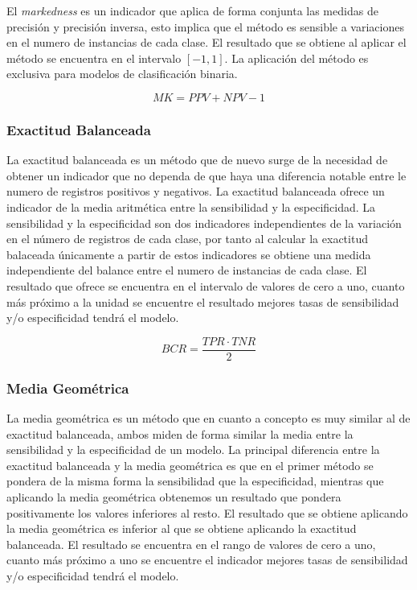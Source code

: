 El \textit{markedness} es un indicador que aplica de forma conjunta las medidas de precisión y precisión inversa, esto implica que el método es sensible a variaciones en el numero de instancias de cada clase. El resultado que se obtiene al aplicar el método se encuentra en el intervalo $[-1, 1]$. La aplicación del método es exclusiva para modelos de clasificación binaria.  


\bigbreak

\begin{equation}
    MK = PPV + NPV - 1
    \label{eq:MK}
\end{equation}


\subsubsection{Exactitud Balanceada}

La exactitud balanceada \cite{bcr2010} es un método que de nuevo surge de la necesidad de obtener un indicador que no dependa de que haya una diferencia notable entre le numero de registros positivos y negativos. La exactitud balanceada ofrece un indicador de la media aritmética entre la sensibilidad y la especificidad. La sensibilidad y la especificidad son dos indicadores independientes de la variación en el número de registros de cada clase, por tanto al calcular la exactitud balaceada únicamente a partir de estos indicadores se obtiene una medida independiente del balance entre el numero de instancias de cada clase. El resultado que ofrece se encuentra en el intervalo de valores de cero a uno, cuanto más próximo a la unidad se encuentre el resultado mejores tasas de sensibilidad y/o especificidad tendrá el modelo.

\bigbreak

\begin{equation}
    BCR = \frac{TPR \cdot TNR}{2}
    \label{eq:BCR}
\end{equation}


\subsubsection{Media Geométrica}

La media geométrica \cite{tharwat_2018} es un método que en cuanto a concepto es muy similar al de exactitud balanceada, ambos miden de forma similar la media entre la sensibilidad y la especificidad de un modelo. La principal diferencia entre la exactitud balanceada y la media geométrica es que en el primer método se pondera de la misma forma la sensibilidad que la especificidad, mientras que aplicando la media geométrica obtenemos un resultado que pondera positivamente los valores inferiores al resto. El resultado que se obtiene aplicando la media geométrica es inferior al que se obtiene aplicando la exactitud balanceada. El resultado se encuentra en el rango de valores de cero a uno, cuanto más próximo a uno se encuentre el indicador mejores tasas de sensibilidad y/o especificidad tendrá el modelo.

